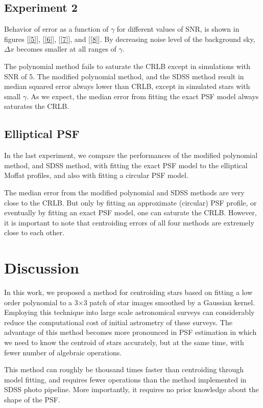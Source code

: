 \documentclass[12pt, preprint]{aastex}
\begin{document}
\subsection{Experiment 2}

Behavior of error as a function of $\gamma$ for different values of SNR, is shown in figures [\ref{5}], [\ref{6}], [\ref{7}], and [\ref{8}]. 
By decreasing noise level of the background sky, $\Delta x$ becomes smaller at all ranges of $\gamma$. 

The polynomial method fails to saturate the CRLB except in simulations with SNR of 5. The modified polynomial method, and the SDSS method result in  median squared error always lower than CRLB, except in simulated stars with small $\gamma$. As we expect, the median error from fitting the exact PSF model always saturates the CRLB.

\subsection{Elliptical PSF}   

In the last experiment, we compare the performances of the modified polynomial method, and SDSS method, with fitting the exact PSF model to the elliptical Moffat profiles, and also with fitting a circular PSF model.

The median error from the modified polynomial and SDSS methods are very close to the CRLB. But only by fitting an approximate (circular) PSF profile, or eventually by fitting an exact PSF model, one can saturate the CRLB. However, it is important to note that centroiding errors of all four methods are extremely close to each other.    


\section{Discussion}\label{sec:discussion}

In this work, we proposed a method for centroiding stars based on fitting a low order polynomial to a 3$\times$3 patch of star images smoothed by a Gaussian kernel. Employing this technique into large scale astronomical surveys can considerably reduce the computational cost of initial astrometry of these surveys. The advantage of this method becomes more pronounced in PSF estimation in which we need to know the centroid of stars accurately, but at the same time, with fewer number of algebraic operations.

This method can roughly be thousand times faster than centroiding through model fitting, and requires fewer operations than the method implemented in SDSS photo pipeline. More importantly, it requires no prior knowledge about the shape of the PSF.
\end{document}

